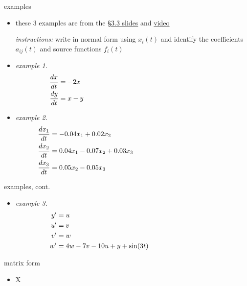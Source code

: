 \documentclass[urlcolor=blue,dvipsnames]{beamer}
\begin{document}
\begin{frame}{examples}

\small
\begin{itemize}
\item these 3 examples are from the \href{https://bueler.github.io/math302/assets/slides/3-3.pdf}{\S3.3 slides} and \href{https://drive.explaineverything.com/thecode/XAAUNGS}{video}

\hrulefill

\noindent \emph{instructions:} write in normal form using $x_i(t)$ and identify the coefficients $a_{ij}(t)$ and source functions $f_i(t)$
\item \emph{example 1.}
\begin{align*}
\frac{dx}{dt} &= - 2 x \hspace{70mm} \\
\frac{dy}{dt} &= x - y
\end{align*}
\item \emph{example 2.}
\begin{align*}
\frac{dx_1}{dt} &= -0.04 x_1 + 0.02 x_2 \hspace{60mm} \\
\frac{dx_2}{dt} &= 0.04 x_1 - 0.07 x_2 + 0.03 x_3 \\
\frac{dx_3}{dt} &= 0.05 x_2 - 0.05 x_3
\end{align*}
\end{itemize}
\end{frame}


\begin{frame}{examples, cont.}

\small
\begin{itemize}
\item \emph{example 3.}
\begin{align*}
y' &= u \hspace{75mm} \\
u' &= v \\
v' &= w \\
w' &= 4w-7v-10u+y+\sin(3t)
\end{align*}
\end{itemize}

\vspace{40mm}
\end{frame}


\begin{frame}{matrix form}

\begin{itemize}
\item X
\end{itemize}
\end{frame}
\end{document}
